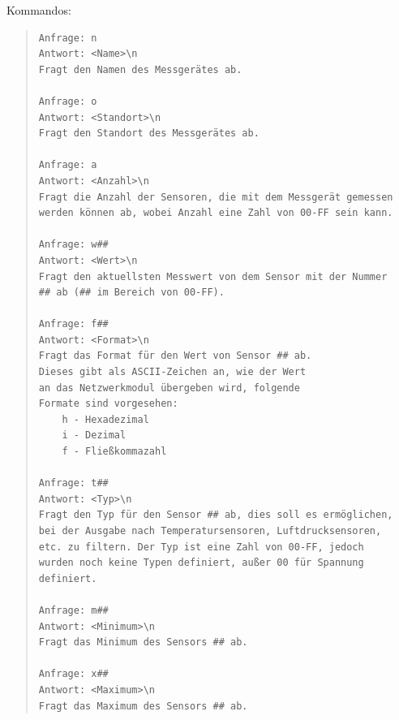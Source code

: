 \documentclass[a4paper,14pt,headsepline]{scrartcl}
\begin{document}
\begin{figure}[h]
\begin{center}
\end{center}
\end{figure}


Kommandos:
\begin{quote}
\begin{verbatim}
Anfrage: n
Antwort: <Name>\n
Fragt den Namen des Messgerätes ab.

Anfrage: o
Antwort: <Standort>\n
Fragt den Standort des Messgerätes ab.

Anfrage: a
Antwort: <Anzahl>\n
Fragt die Anzahl der Sensoren, die mit dem Messgerät gemessen
werden können ab, wobei Anzahl eine Zahl von 00-FF sein kann.

Anfrage: w##
Antwort: <Wert>\n
Fragt den aktuellsten Messwert von dem Sensor mit der Nummer
## ab (## im Bereich von 00-FF).

Anfrage: f##
Antwort: <Format>\n
Fragt das Format für den Wert von Sensor ## ab.
Dieses gibt als ASCII-Zeichen an, wie der Wert
an das Netzwerkmodul übergeben wird, folgende
Formate sind vorgesehen:
    h - Hexadezimal
    i - Dezimal
    f - Fließkommazahl
    
Anfrage: t##
Antwort: <Typ>\n
Fragt den Typ für den Sensor ## ab, dies soll es ermöglichen,
bei der Ausgabe nach Temperatursensoren, Luftdrucksensoren,
etc. zu filtern. Der Typ ist eine Zahl von 00-FF, jedoch
wurden noch keine Typen definiert, außer 00 für Spannung
definiert.

Anfrage: m##
Antwort: <Minimum>\n
Fragt das Minimum des Sensors ## ab.

Anfrage: x##
Antwort: <Maximum>\n
Fragt das Maximum des Sensors ## ab.
\end{verbatim}
\end{quote}
\end{document}
